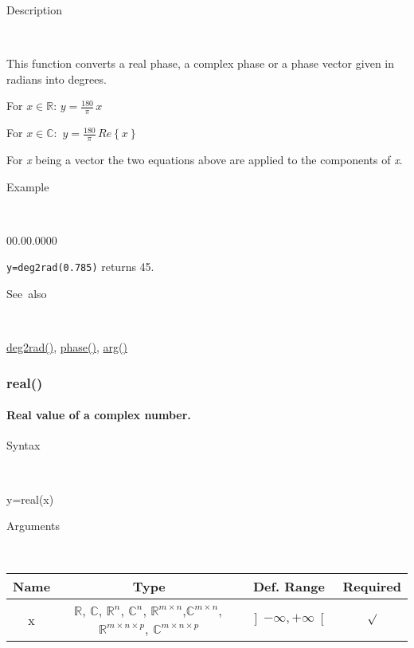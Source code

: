 \begin{description}
\item [Description]~
\end{description}
This function converts a real phase, a complex phase or a phase vector
given in radians into degrees. 

\medskip{}
For $x\in\mathbb{R}$: $y={\displaystyle \frac{180}{\pi}}\, x$

\medskip{}
For $x\mathbb{\mathbb{\in C}}:$ $y={\displaystyle \frac{180}{\pi}}\, Re\left\{ x\right\} $
\medskip{}

\noindent For \textit{x} being a vector the two equations above are
applied to the components of \textit{x}.

\begin{description}
\item [Example]~
\end{description}
\begin{lyxlist}{00.00.0000}
\item [\texttt{y=deg2rad(0.785)}]returns 45.
\end{lyxlist}
\begin{description}
\item [See~also]~
\end{description}
\textcolor{blue}{\hyperlink{deg2rad}{deg2rad()}}, \textcolor{blue}{\hyperlink{phase}{phase()}},
\textcolor{blue}{\hyperlink{arg}{arg()}}


\newpage
\subsubsection*{\hypertarget{real}{}{\Large real()}}


\paragraph{\label{par:Real}Real value of a complex number.}

\begin{description}
\item [Syntax]~
\end{description}
y=real(x)

\begin{description}
\item [Arguments]~
\end{description}
\begin{tabular}{|c|c|c|c|}
\hline 
Name&
Type&
Def. Range&
Required\tabularnewline
\hline
\hline 
x&
$\mathbb{R}$, $\mathbb{C}$, $\mathbb{R}^{n}$, $\mathbb{C}^{n}$,
$\mathbb{\mathbb{R}}^{m\times n}$,$\mathbb{\mathbb{C}}^{m\times n},$$\mathbb{\mathbb{R}}^{m\times n\times p}$,
$\mathbb{\mathbb{C}}^{m\times n\times p}$ &
$\left]-\infty,+\infty\right[$&
$\surd$\tabularnewline
\hline
\end{tabular}

